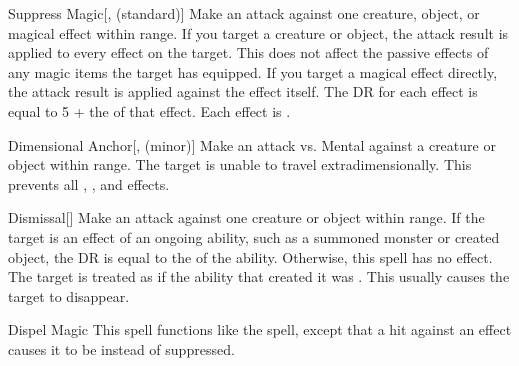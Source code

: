\lowercase{\hypertarget{spell:Suppress Magic}{}}\label{spell:Suppress Magic}
\begin{ability}[\nth{1}]{\hypertarget{spell:Suppress Magic}{Suppress Magic}}[,  (standard)]
Make an attack against one creature, object, or magical effect within \rngmed range.
If you target a creature or object, the attack result is applied to every  effect on the target.
This does not affect the passive effects of any magic items the target has equipped.
If you target a magical effect directly, the attack result is applied against the effect itself.
The DR for each effect is equal to 5 + the  of that effect.
\hit Each effect is .
\end{ability}
\vspace{0.25em}



\lowercase{\hypertarget{spell:Dimensional Anchor}{}}\label{spell:Dimensional Anchor}
\begin{ability}[\nth{2}]{\hypertarget{spell:Dimensional Anchor}{Dimensional Anchor}}[,  (minor)]
Make an attack vs. Mental against a creature or object within \rngmed range.
\hit The target is unable to travel extradimensionally.
This prevents all , , and  effects.
\end{ability}
\vspace{0.25em}



\lowercase{\hypertarget{spell:Dismissal}{}}\label{spell:Dismissal}
\begin{ability}[\nth{2}]{\hypertarget{spell:Dismissal}{Dismissal}}[]
Make an attack against one creature or object within \rngmed range.
If the target is an effect of an ongoing  ability, such as a summoned monster or created object, the DR is equal to the  of the ability.
Otherwise, this spell has no effect.
\hit The target is treated as if the ability that created it was .
This usually causes the target to disappear.
\end{ability}
\vspace{0.25em}



\lowercase{\hypertarget{spell:Dispel Magic}{}}\label{spell:Dispel Magic}
\begin{ability}[\nth{2}]{\hypertarget{spell:Dispel Magic}{Dispel Magic}}
This spell functions like the  spell, except that a hit against an effect causes it to be  instead of suppressed.
\end{ability}
\vspace{0.25em}



